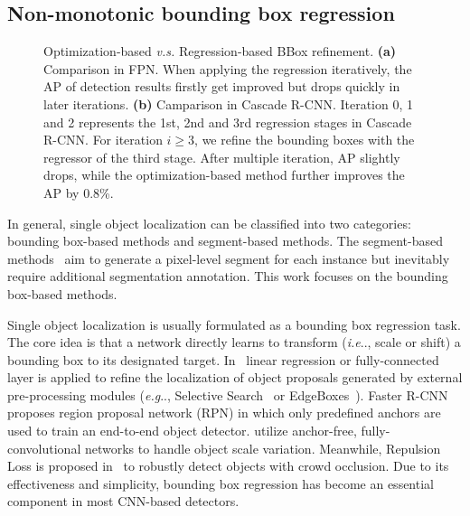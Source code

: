 \documentclass[runningheads]{llncs}
\makeatletter
\DeclareRobustCommand\onedot{\futurelet\@let@token\@onedot}
\def\@onedot{\ifx\@let@token.\else.\null\fi\xspace}
\def\eg{\emph{e.g}\onedot} \def\Eg{\emph{E.g}\onedot}
\def\ie{\emph{i.e}\onedot} \def\Ie{\emph{I.e}\onedot}
\makeatother
\begin{document}
\subsection{Non-monotonic bounding box regression}
\label{sec:problem:bbreg}

\begin{figure}[t]
\centering
{}\quad
{}
\caption{Optimization-based \emph{v.s.} Regression-based BBox refinement. \textbf{(a)} Comparison in FPN. When applying the regression iteratively, the AP of detection results firstly get improved but drops quickly in later iterations. \textbf{(b)} Camparison in Cascade R-CNN. Iteration 0, 1 and 2 represents the 1st, 2nd and 3rd regression stages in Cascade R-CNN. For iteration $i \ge 3$, we refine the bounding boxes with the regressor of the third stage. After multiple iteration, AP slightly drops, while the optimization-based method further improves the AP by 0.8\%.
}
\label{fig:apiter}
\end{figure}

In general, single object localization can be classified into two categories: bounding box-based methods and segment-based methods. The segment-based methods~\cite{pinheiro2015learning,pinheiro2016learning,hu2017fastmask,he2017mask} aim to generate a pixel-level segment for each instance but inevitably require additional segmentation annotation. This work focuses on the bounding box-based methods.

Single object localization is usually formulated as a bounding box regression task. The core idea is that a network directly learns to transform (\ie, scale or shift) a bounding box to its designated target.
In~\cite{Girshick_2014_CVPR,Girshick_2015_ICCV} linear regression or fully-connected layer is applied to refine the localization of object proposals generated by external pre-processing modules (\eg, Selective Search~\cite{uijlings2013selective} or EdgeBoxes~\cite{zitnick2014edge}). Faster R-CNN~\cite{NIPS2015_5638} proposes region proposal network (RPN) in which only predefined anchors are used to train an end-to-end object detector. \cite{huang2015densebox,yu2016unitbox} utilize anchor-free, fully-convolutional networks to handle object scale variation. Meanwhile, Repulsion Loss is proposed in~\cite{wang2017repulsion} to robustly detect objects with crowd occlusion.
Due to its effectiveness and simplicity, bounding box regression has become an essential component in most CNN-based detectors. 
\end{document}
